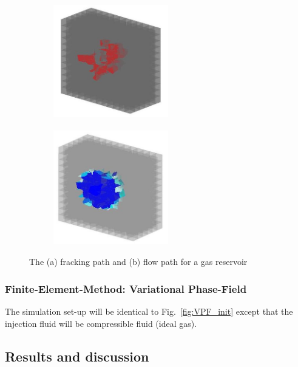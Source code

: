 \begin{figure}[!ht]
\begin{subfigure}[c]{0.48\textwidth}
\centering
\includegraphics[width=5cm,height=5cm]{figures/Amir_ME4_Gas_Frack.png}
\subcaption{}
\label{fig:Amir_ME4_Gas_Frack}
\end{subfigure}
\hfill
\begin{subfigure}[c]{0.48\textwidth}
\centering
\includegraphics[width=5cm,height=5cm]{figures/Amir_ME4_Gas_Flow.png}
\subcaption{}
\label{fig:Amir_ME4_Gas_Flow}
\end{subfigure}
\caption{The (a) fracking path and (b) flow path for a gas reservoir}
\end{figure}

\subsubsection*{Finite-Element-Method: Variational Phase-Field}

The simulation set-up will be identical to Fig.~\ref{fig:VPF_init} except that the injection fluid will be compressible fluid (ideal gas). 


\subsection{Results and discussion}
